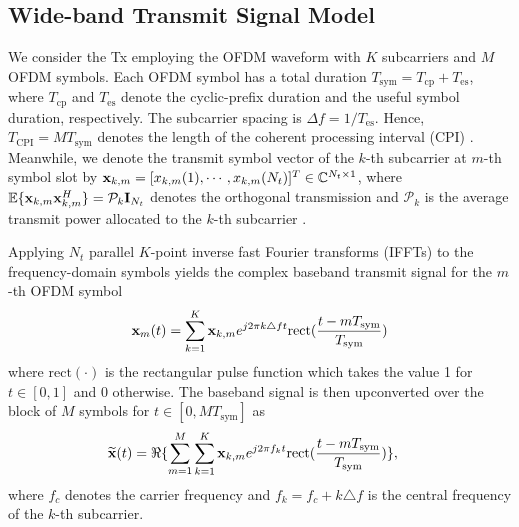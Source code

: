 \documentclass[9pt,final,journal,twocolumn]{IEEEtran}
\begin{document}
\subsection{Wide-band Transmit Signal Model}

We consider the Tx employing the OFDM waveform with $K$ subcarriers and $M$ OFDM symbols. Each OFDM symbol has a total duration $T_{\mathrm{sym}} = T_{\mathrm{cp}} + T_{\mathrm{es}}$, where $T_{\mathrm{cp}}$ and $T_{\mathrm{es}}$ denote the cyclic-prefix duration and the useful symbol duration, respectively. The subcarrier spacing is $\Delta f = 1/T_{\mathrm{es}}$. Hence, $T_{\mathrm{CPI}}=MT_{\mathrm{sym}}$ denotes the length of the coherent processing interval (CPI) \cite{liu2020super}.
Meanwhile, we denote the transmit symbol vector of the $k$-th subcarrier at $m$-th symbol slot by  ${\bf x}_{k,m}=[x_{k,m}(1),\cdots,x_{k,m}(N_t)]^T\in\mathbb{C}^{N_t\times 1}$, where $\mathbb{E}\{{\bf x}_{k,m}{\bf x}_{k,m}^H\}=\mathcal{P}_k{\bf I}_{N_t}$ denotes the orthogonal transmission and $\mathcal{P}_k$ is the average transmit power allocated to the $k$-th subcarrier \cite{keskin2021MIMO,yang2024performance}. 

Applying $N_t$ parallel $K$-point inverse fast Fourier transforms (IFFTs) to the frequency-domain symbols yields the complex baseband transmit signal for the $m$-th OFDM symbol \cite{keskin2021limited} 
\begin{align}\label{transmit_BB}
  {\bf x}_m(t)  = \sum_{k=1}^{K} {\bf x}_{k,m}e^{j2\pi{k}\triangle{f}t}\mathrm{rect}(\frac{t-mT_{\mathrm{sym}}}{T_{\mathrm{sym}}})
\end{align}
where $\mathrm{rect}(\cdot)$ is the rectangular pulse function which takes the value 1 for $t\in[0,1]$ and 0 otherwise. 
The baseband signal is then upconverted  over the block of $M$ symbols
for $t\in[0,MT_{\mathrm{sym}}]$ as \cite{zheng2017super}
\begin{align}\label{transmit_UC}
  \widetilde{\bf x}(t)  
  &=\Re\{\sum_{m=1}^{M}\sum_{k=1}^{K} {\bf x}_{k,m}e^{j2\pi{f_k}t}\mathrm{rect}(\frac{t-mT_{\mathrm{sym}}}{T_{\mathrm{sym}}})\},
\end{align}
where $f_c$ denotes the carrier frequency and $f_k=f_c+{k}\triangle{f}$ is the central frequency of the $k$-th subcarrier. 
\end{document}
